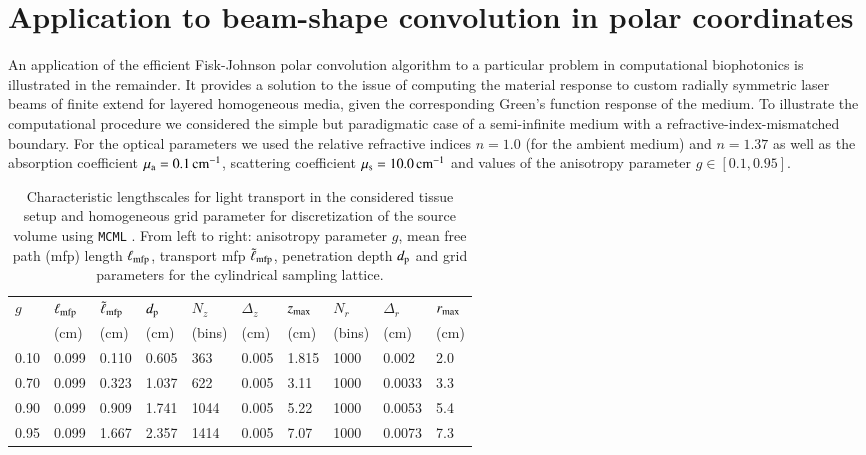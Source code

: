 \documentclass[review]{elsarticle}
\begin{document}
\section{Application to beam-shape convolution in polar coordinates}
\label{sec:polarConv}

An application of the efficient Fisk-Johnson polar convolution algorithm to a
particular problem in computational biophotonics is illustrated in the
remainder. It provides a solution to the issue of computing the material
response to custom radially symmetric laser beams of finite extend for layered
homogeneous media, given the corresponding Green's function response of the
medium. 
To illustrate the computational procedure we considered the simple but
paradigmatic case of a semi-infinite medium with a refractive-index-mismatched
boundary. For the optical parameters we used the relative refractive indices
$n=1.0$ (for the ambient medium) and $n=1.37$ as well as the absorption
coefficient $\mu_{\rm a}=0.1\,{\rm cm^{-1}}$, scattering coefficient $\mu_{\rm
s}=10.0\,{\rm cm^{-1}}$ and values of the anisotropy parameter
$g\in[0.1,0.95]$.  

%
%
\begin{table}[t]
\caption{\label{tab:simPars} 
Characteristic lengthscales \cite{Wilson:1990} for light transport in the
considered tissue setup and homogeneous grid parameter for discretization of
the source volume using {\tt MCML} \cite{MCML:1995}. From left to right:
anisotropy parameter $g$, mean free path (mfp) length $\ell_{\rm mfp}$,
transport mfp $\tilde{\ell}_{\rm mfp}$, penetration depth $d_{\rm p}$ and grid
parameters for the cylindrical 
sampling lattice.}
\begin{tabular}[c]{llllllllll}
\hline
$g$ & $\ell_{\rm mfp}$  & $\tilde{\ell}_{\rm mfp}$   & $d_{\rm p}$ & $N_z$ & $\Delta_z$ & $z_{\rm max}$ &   $N_r$ & $\Delta_r$ & $r_{\rm max}$   \\
 & (cm)  & (cm)  & (cm) & (bins) & (cm) & (cm) & (bins) & (cm) & (cm)   \\
\hline \hline 
0.10 & 0.099 & 0.110 & 0.605 & 363  & 0.005 & 1.815 & 1000 & 0.002 & 2.0   \\
0.70 & 0.099 & 0.323 & 1.037 & 622  & 0.005 & 3.11 & 1000 & 0.0033 & 3.3   \\
0.90 & 0.099 & 0.909 & 1.741 & 1044 & 0.005 & 5.22 & 1000 & 0.0053 & 5.4   \\
0.95 & 0.099 & 1.667 & 2.357 & 1414 & 0.005 & 7.07 & 1000 & 0.0073 & 7.3   \\
\hline
\end{tabular}
\end{table}
\end{document}

